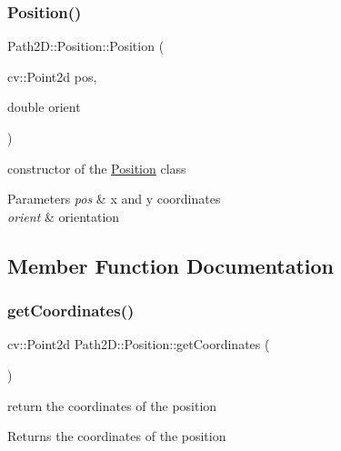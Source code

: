 \subsubsection{\texorpdfstring{Position()}{Position()}}
{\footnotesize\ttfamily Path2\+D\+::\+Position\+::\+Position (\begin{DoxyParamCaption}\item[{cv\+::\+Point2d}]{pos,  }\item[{double}]{orient }\end{DoxyParamCaption})}



constructor of the \mbox{\hyperlink{class_path2_d_1_1_position}{Position}} class 


\begin{DoxyParams}{Parameters}
{\em pos} & x and y coordinates \\
\hline
{\em orient} & orientation \\
\hline
\end{DoxyParams}


\subsection{Member Function Documentation}
\mbox{\label{class_path2_d_1_1_position_aad6d30712f50deea47f1d8994a5ede85}} 
\subsubsection{\texorpdfstring{get\+Coordinates()}{getCoordinates()}}
{\footnotesize\ttfamily cv\+::\+Point2d Path2\+D\+::\+Position\+::get\+Coordinates (\begin{DoxyParamCaption}{ }\end{DoxyParamCaption})}



return the coordinates of the position 

\begin{DoxyReturn}{Returns}
the coordinates of the position 
\end{DoxyReturn}
\mbox{\label{class_path2_d_1_1_position_a092e7b2a7dc639ba12c0650a226bbe39}} 
